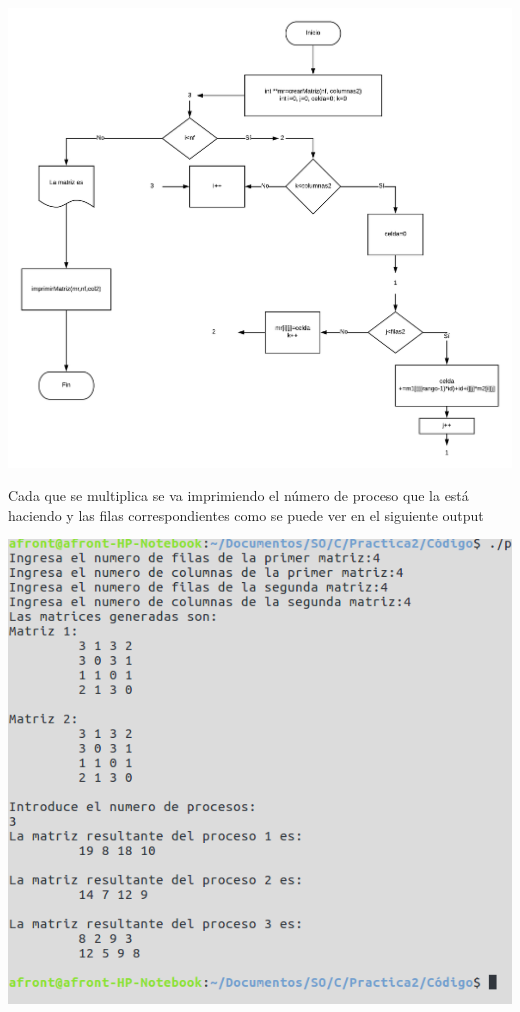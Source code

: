 \documentclass[10pt,a4paper]{article}
\begin{document}
\begin{center}
	\includegraphics[scale=0.5]{multiplicarMatriz.png} 
\end{center}

\begin{flushleft}
Cada que se multiplica se va imprimiendo el número de proceso que la está haciendo y las filas correspondientes como se puede ver en el siguiente output
\end{flushleft}

\begin{flushleft}
	\includegraphics[scale=0.5]{screen.png} 
\end{flushleft}
\end{document}
